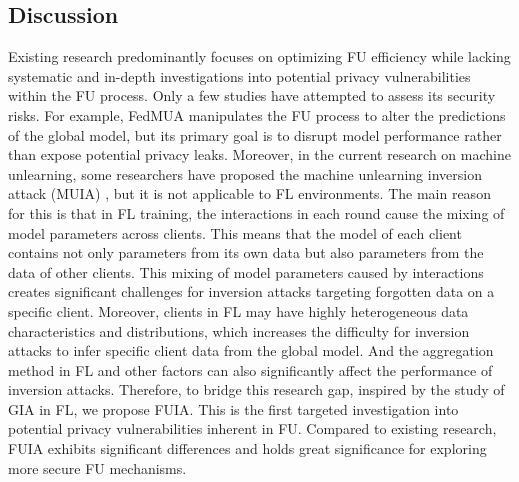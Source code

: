 \subsection{Discussion}
Existing research predominantly focuses on optimizing FU efficiency while lacking systematic and in-depth investigations into potential privacy vulnerabilities within the FU process.
Only a few studies have attempted to assess its security risks. For example, FedMUA \cite{chen2025fedmua} manipulates the FU process to alter the predictions of the global model, but its primary goal is to disrupt model performance rather than expose potential privacy leaks.  
Moreover, in the current research on machine unlearning, some researchers have proposed the machine unlearning inversion attack (MUIA) \cite{hu2024learn}, but it is not applicable to FL environments. The main reason for this is that in FL training, the interactions in each round cause the mixing of model parameters across clients. This means that the model of each client contains not only parameters from its own data but also parameters from the data of other clients. This mixing of model parameters caused by interactions creates significant challenges for inversion attacks targeting forgotten data on a specific client. Moreover, clients in FL may have highly heterogeneous data characteristics and distributions, which increases the difficulty for inversion attacks to infer specific client data from the global model. And the aggregation method in FL and other factors can also significantly affect the performance of inversion attacks.   
Therefore, to bridge this research gap, inspired by the study of GIA in FL, we propose FUIA. This is the first targeted investigation into potential privacy vulnerabilities inherent in FU.
Compared to existing research, FUIA exhibits significant differences and holds great significance for exploring more secure FU mechanisms.